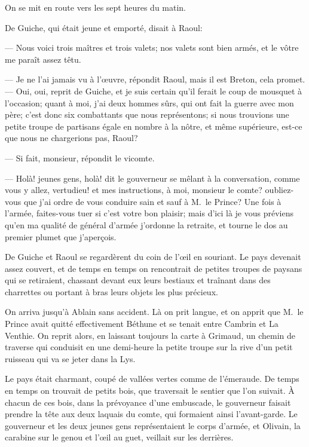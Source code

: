 On se mit en route vers les sept heures du matin.

De Guiche, qui était jeune et emporté, disait à Raoul:

— Nous voici trois maîtres et trois valets; nos valets sont bien armés, et le vôtre me paraît assez têtu.

— Je ne l'ai jamais vu à l'œuvre, répondit Raoul, mais il est Breton, cela promet.
— Oui, oui, reprit de Guiche, et je suis certain qu'il ferait le coup de mousquet à l'occasion; quant à moi, j'ai deux hommes sûrs, qui ont fait la guerre avec mon père; c'est donc six combattants que nous représentons; si nous trouvions une petite troupe de partisans égale en nombre à la nôtre, et même supérieure, est-ce que nous ne chargerions pas, Raoul?

— Si fait, monsieur, répondit le vicomte.

— Holà! jeunes gens, holà! dit le gouverneur se mêlant à la conversation, comme vous y allez, vertudieu! et mes instructions, à moi, monsieur le comte? oubliez-vous que j'ai ordre de vous conduire sain et sauf à M.~le Prince? Une fois à l'armée, faites-vous tuer si c'est votre bon plaisir; mais d'ici là je vous préviens qu'en ma qualité de général d'armée j'ordonne la retraite, et tourne le dos au premier plumet que j'aperçois.

De Guiche et Raoul se regardèrent du coin de l'œil en souriant. Le pays devenait assez couvert, et de temps en temps on rencontrait de petites troupes de paysans qui se retiraient, chassant devant eux leurs bestiaux et traînant dans des charrettes ou portant à bras leurs objets les plus précieux.

On arriva jusqu'à Ablain sans accident. Là on prit langue, et on apprit que M.~le Prince avait quitté effectivement Béthune et se tenait entre Cambrin et La Venthie. On reprit alors, en laissant toujours la carte à Grimaud, un chemin de traverse qui conduisit en une demi-heure la petite troupe sur la rive d'un petit ruisseau qui va se jeter dans la Lys.

Le pays était charmant, coupé de vallées vertes comme de l'émeraude. De temps en temps on trouvait de petits bois, que traversait le sentier que l'on suivait. À chacun de ces bois, dans la prévoyance d'une embuscade, le gouverneur faisait prendre la tête aux deux laquais du comte, qui formaient ainsi l'avant-garde. Le gouverneur et les deux jeunes gens représentaient le corps d'armée, et Olivain, la carabine sur le genou et l'œil au guet, veillait sur les derrières.

